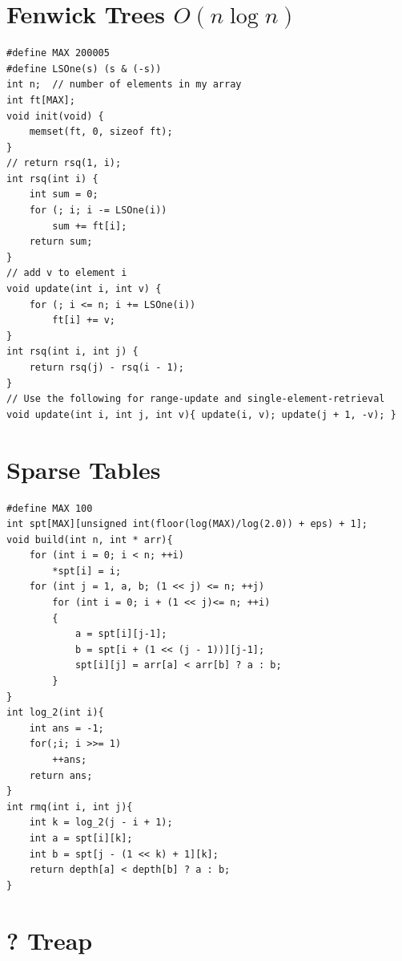 \documentclass[12pt]{book}
\begin{document}
\section{Fenwick Trees $O(n\log n)$}
\begin{verbatim}
#define MAX 200005
#define LSOne(s) (s & (-s))
int n;	// number of elements in my array
int ft[MAX];
void init(void) {
	memset(ft, 0, sizeof ft);
}
// return rsq(1, i);
int rsq(int i) {
	int sum = 0;
	for (; i; i -= LSOne(i))
		sum += ft[i];
	return sum;
}
// add v to element i
void update(int i, int v) {
	for (; i <= n; i += LSOne(i))
		ft[i] += v;
}
int rsq(int i, int j) {
	return rsq(j) - rsq(i - 1);
}
// Use the following for range-update and single-element-retrieval
void update(int i, int j, int v){ update(i, v); update(j + 1, -v); }
\end{verbatim}
\section{Sparse Tables}
\begin{verbatim}
#define MAX 100
int spt[MAX][unsigned int(floor(log(MAX)/log(2.0)) + eps) + 1];
void build(int n, int * arr){
	for (int i = 0; i < n; ++i)
		*spt[i] = i;
	for (int j = 1, a, b; (1 << j) <= n; ++j)
		for (int i = 0; i + (1 << j)<= n; ++i)
		{
			a = spt[i][j-1];
			b = spt[i + (1 << (j - 1))][j-1];
			spt[i][j] = arr[a] < arr[b] ? a : b;
		}
}
int log_2(int i){
	int ans = -1;
	for(;i; i >>= 1)
		++ans;
	return ans;
}
int rmq(int i, int j){
	int k = log_2(j - i + 1);
	int a = spt[i][k];
	int b = spt[j - (1 << k) + 1][k];
	return depth[a] < depth[b] ? a : b;
}
\end{verbatim}
\section{? Treap}
\end{document}

